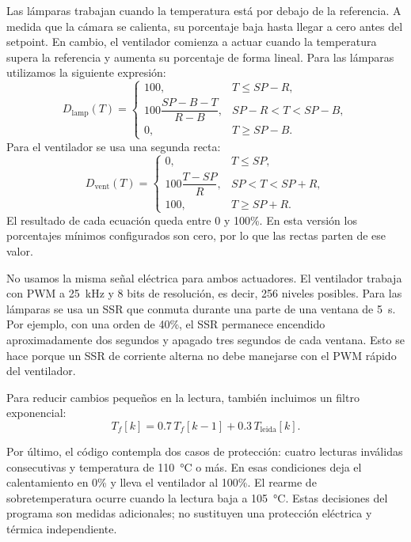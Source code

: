 \documentclass[11pt,letterpaper]{article}
\begin{document}
Las lámparas trabajan cuando la temperatura está por debajo de la referencia. A medida que la cámara se calienta, su porcentaje baja hasta llegar a cero antes del setpoint. En cambio, el ventilador comienza a actuar cuando la temperatura supera la referencia y aumenta su porcentaje de forma lineal. Para las lámparas utilizamos la siguiente expresión:
\begin{equation}
D_{\mathrm{lamp}}(T)=
\begin{cases}
100, & T\leq SP-R,\\
100\dfrac{SP-B-T}{R-B}, & SP-R<T<SP-B,\\
0, & T\geq SP-B.
\end{cases}
\label{eq:lamp}
\end{equation}
Para el ventilador se usa una segunda recta:
\begin{equation}
D_{\mathrm{vent}}(T)=
\begin{cases}
0, & T\leq SP,\\
100\dfrac{T-SP}{R}, & SP<T<SP+R,\\
100, & T\geq SP+R.
\end{cases}
\label{eq:fan}
\end{equation}
El resultado de cada ecuación queda entre 0 y 100\%. En esta versión los porcentajes mínimos configurados son cero, por lo que las rectas parten de ese valor.

No usamos la misma señal eléctrica para ambos actuadores. El ventilador trabaja con PWM a \SI{25}{\kilo\hertz} y 8 bits de resolución, es decir, 256 niveles posibles. Para las lámparas se usa un SSR que conmuta durante una parte de una ventana de \SI{5}{\second}. Por ejemplo, con una orden de 40\%, el SSR permanece encendido aproximadamente dos segundos y apagado tres segundos de cada ventana. Esto se hace porque un SSR de corriente alterna no debe manejarse con el PWM rápido del ventilador.

Para reducir cambios pequeños en la lectura, también incluimos un filtro exponencial:
\begin{equation}
T_f[k]=0.7\,T_f[k-1]+0.3\,T_{\mathrm{leida}}[k].
\label{eq:filtro}
\end{equation}

Por último, el código contempla dos casos de protección: cuatro lecturas inválidas consecutivas y temperatura de \SI{110}{\celsius} o más. En esas condiciones deja el calentamiento en 0\% y lleva el ventilador al 100\%. El rearme de sobretemperatura ocurre cuando la lectura baja a \SI{105}{\celsius}. Estas decisiones del programa son medidas adicionales; no sustituyen una protección eléctrica y térmica independiente.
\end{document}
